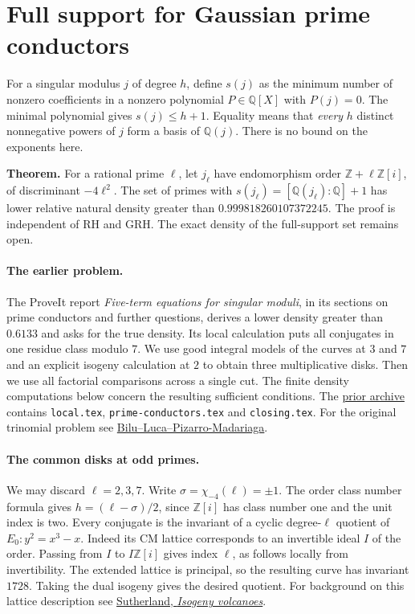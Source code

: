 \section{Full support for Gaussian prime conductors}
\label{sec:gaussian}

For a singular modulus $j$ of degree $h$, define $s(j)$ as the minimum
number of nonzero coefficients in a nonzero polynomial $P\in\mathbb Q[X]$
with $P(j)=0$. The minimal polynomial gives $s(j)\le h+1$. Equality
means that \emph{every} $h$ distinct nonnegative powers of $j$ form a
basis of $\mathbb Q(j)$. There is no bound on the exponents here.

\medskip\noindent\textbf{Theorem.}
For a rational prime $\ell$, let $j_\ell$ have endomorphism order
$\mathbb Z+\ell\mathbb Z[i]$, of discriminant $-4\ell^2$. The set of
primes with $s(j_\ell)=[\mathbb Q(j_\ell):\mathbb Q]+1$ has lower
relative natural density greater than $0.999818260107372245$.
The proof is independent of RH and GRH. The exact density of the
full-support set remains open.

\paragraph{The earlier problem.}
The ProveIt report \emph{Five-term equations for singular moduli},
in its sections on prime conductors and further questions, derives a
lower density greater than $0.6133$ and asks for the true density.
Its local calculation puts all conjugates in one residue class modulo
$7$. We use good integral models of the curves at $3$ and $7$ and an
explicit isogeny calculation at $2$ to obtain three multiplicative disks. Then we use all factorial comparisons across a single
cut. The finite density computations below concern the resulting
sufficient conditions. The
\href{https://github.com/VladimirReshetnikov/ProveIt/blob/6fe2c1bd450aa7f19eab17fb9a6e76170b4fce00/docs/incoming/grh_sparse_singular_moduli.zip}{prior archive}
contains \texttt{local.tex}, \texttt{prime-conductors.tex} and
\texttt{closing.tex}. For the original trinomial problem see
\href{https://arxiv.org/abs/2003.06547}{Bilu--Luca--Pizarro-Madariaga}.

\paragraph{The common disks at odd primes.}
We may discard $\ell=2,3,7$. Write $\sigma=\chi_{-4}(\ell)=\pm1$.
The order class number formula gives $h=(\ell-\sigma)/2$, since
$\mathbb Z[i]$ has class number one and the unit index is two.
Every conjugate is the invariant of a cyclic degree-$\ell$ quotient
of $E_0:y^2=x^3-x$. Indeed its CM lattice corresponds to an invertible
ideal $I$ of the order. Passing from $I$ to $I\mathbb Z[i]$ gives index
$\ell$, as follows locally from invertibility. The extended lattice
is principal, so the resulting curve has invariant $1728$. Taking
the dual isogeny gives the desired quotient. For background on this
lattice description see
\href{https://arxiv.org/abs/1208.5370}{Sutherland, \emph{Isogeny volcanoes}}.


